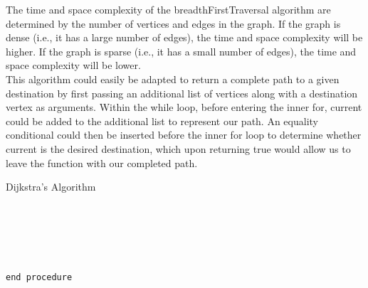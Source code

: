 \documentclass[a4paper]{article}
\begin{document}
The time and space complexity of the breadthFirstTraversal algorithm are determined by the number of vertices and edges in the graph.
If the graph is dense (i.e., it has a large number of edges), the time and space complexity will be higher. 
If the graph is sparse (i.e., it has a small number of edges), the time and space complexity will be lower. \\

This algorithm could easily be adapted to return a complete path to a given destination
by first passing an additional list of vertices along with a destination vertex as arguments.
Within the while loop, before entering the inner for,
current could be added to the additional list to represent our path.
An equality conditional could then be inserted before the inner for loop
to determine whether current is the desired destination, 
which upon returning true would allow us to leave the function with our completed path. 

\newpage


\begin{algorithm}
\caption{Dijkstra's Algorithm}\label{euclid}
\begin{algorithmic}[1]
 \\
 \\

\State{}
\State\quad{}
\State{}

\State{}

 \\

\State{}
\State{}
\State\quad{}
\State\quad{}
\State\quad{}
\State\quad\quad{}
\State\quad\quad{} 
\State\quad\quad{}
\State\quad{}
\State{}
 \\
{\tt end procedure}
\EndProcedure
\end{algorithmic}
\end{algorithm}
\end{document}
